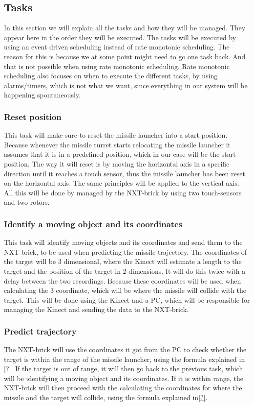 \subsection*{Tasks}
	In this section we will explain all the tasks and how they will be managed. They appear here in the order they will be executed. The tasks will be executed by using an event driven scheduling instead of rate monotonic scheduling. The reason for this is because we at some point might need to go one task back. And that is not possible when using rate monotonic scheduling. Rate monotonic scheduling also focuses on when to execute the different tasks, by using alarms/timers, which is not what we want, since everything in our system will be happening spontaneously.

\subsubsection{Reset position}
	This task will make sure to reset the missile launcher into a start position. Because whenever the missile turret starts relocating the missile launcher it assumes that it is in a predefined position, which in our case will be the start position. 
	The way it will reset is by moving the horizontal axis in a specific direction until it reaches a touch sensor, thus the missile launcher has been reset on the horizontal axis. The same principles will be applied to the vertical axis. All this will be done by managed by the NXT-brick by using two touch-sensors and two rotors.
	
\subsubsection{Identify a moving object and its coordinates}
	This task will identify moving objects and its coordinates and send them to the NXT-brick, to be used when predicting the missile trajectory.
	The coordinates of the target will be 3 dimensional, where the Kinect will estimate a length to the target and the position of the target in 2-dimensions. It will do this twice with a delay between the two recordings. Because these coordinates will be used when calculating the 3 coordinate, which will be where the missile will collide with the target.
	This will be done using the Kinect and a PC, which will be responsible for managing the Kinect and sending the data to the NXT-brick.
	
\subsubsection{Predict trajectory}
	The NXT-brick will use the coordinates it got from the PC to check whether the target is within the range of the missile launcher, using the formula explained in \ref{?}. If the target is out of range, it will then go back to the previous task, which will be identifying a moving object and its coordinates. If it is within range, the NXT-brick will then proceed with the calculating the coordinates for where the missile and the target will collide, using the formula explained in\ref{?}.
	

